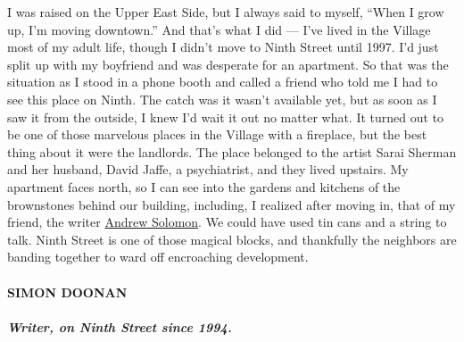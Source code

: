 I was raised on the Upper East Side, but I always said to myself, ``When
I grow up, I'm moving downtown.'' And that's what I did --- I've lived
in the Village most of my adult life, though I didn't move to Ninth
Street until 1997. I'd just split up with my boyfriend and was desperate
for an apartment. So that was the situation as I stood in a phone booth
and called a friend who told me I had to see this place on Ninth. The
catch was it wasn't available yet, but as soon as I saw it from the
outside, I knew I'd wait it out no matter what. It turned out to be one
of those marvelous places in the Village with a fireplace, but the best
thing about it were the landlords. The place belonged to the artist
Sarai Sherman and her husband, David Jaffe, a psychiatrist, and they
lived upstairs. My apartment faces north, so I can see into the gardens
and kitchens of the brownstones behind our building, including, I
realized after moving in, that of my friend, the writer
\href{https://www.nytimes.com/2016/08/05/t-magazine/entertainment/andrew-solomon-favorite-books.html}{Andrew
Solomon}. We could have used tin cans and a string to talk. Ninth Street
is one of those magical blocks, and thankfully the neighbors are banding
together to ward off encroaching development.

\hypertarget{simon-doonan}{%
\paragraph{SIMON DOONAN}\label{simon-doonan}}

\hypertarget{writer-on-ninth-street-since-1994}{%
\subparagraph{\texorpdfstring{\textbf{Writer, on Ninth Street since
1994.}}{Writer, on Ninth Street since 1994.}}\label{writer-on-ninth-street-since-1994}}

